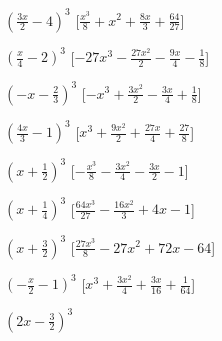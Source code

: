 \begin{esercizio}
\begin{multicols}{2}
\begin{enumeratea}
\item \(\left(\frac{3 x}{2} - 4\right)^{3}\)
  \hfill [\(\frac{x^{3}}{8} + x^{2} + \frac{8 x}{3} + \frac{64}{27}\)]
\item \(\left(\frac{x}{4} - 2\right)^{3}\)
  \hfill [\(- 27 x^{3} - \frac{27 x^{2}}{2} - \frac{9 x}{4} - \frac{1}{8}\)]
\item \(\left(- x - \frac{2}{3}\right)^{3}\)
  \hfill [\(- x^{3} + \frac{3 x^{2}}{2} - \frac{3 x}{4} + \frac{1}{8}\)]
\item \(\left(\frac{4 x}{3} - 1\right)^{3}\)
  \hfill [\(x^{3} + \frac{9 x^{2}}{2} + \frac{27 x}{4} + \frac{27}{8}\)]
\item \(\left(x + \frac{1}{2}\right)^{3}\)
  \hfill [\(- \frac{x^{3}}{8} - \frac{3 x^{2}}{4} - \frac{3 x}{2} - 1\)]
\item \(\left(x + \frac{1}{4}\right)^{3}\)
  \hfill [\(\frac{64 x^{3}}{27} - \frac{16 x^{2}}{3} + 4 x - 1\)]
\item \(\left(x + \frac{3}{2}\right)^{3}\)
  \hfill [\(\frac{27 x^{3}}{8} - 27 x^{2} + 72 x - 64\)]
\item \(\left(- \frac{x}{2} - 1\right)^{3}\)
  \hfill [\(x^{3} + \frac{3 x^{2}}{4} + \frac{3 x}{16} + \frac{1}{64}\)]
\item \(\left(2 x - \frac{3}{2}\right)^{3}\)

\end{enumeratea}
\end{multicols}
\end{esercizio}
